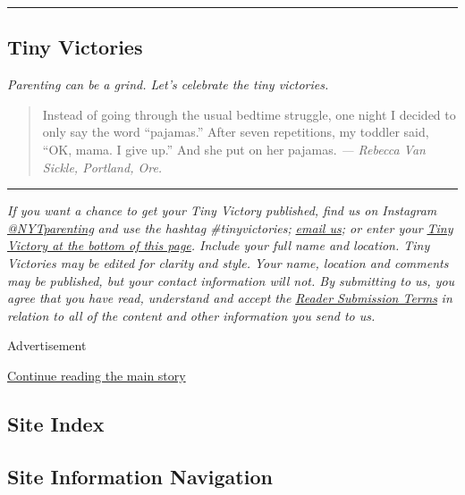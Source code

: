 \begin{center}\rule{0.5\linewidth}{\linethickness}\end{center}

\hypertarget{tiny-victories}{%
\subsection{Tiny Victories}\label{tiny-victories}}

\emph{Parenting can be a grind. Let's celebrate the tiny victories.}

\begin{quote}
Instead of going through the usual bedtime struggle, one night I decided
to only say the word ``pajamas.'' After seven repetitions, my toddler
said, ``OK, mama. I give up.'' And she put on her pajamas. \emph{---
Rebecca Van Sickle, Portland, Ore.}
\end{quote}

\begin{center}\rule{0.5\linewidth}{\linethickness}\end{center}

\emph{If you want a chance to get your Tiny Victory published, find us
on Instagram}
\href{https://www.instagram.com/nytparenting/}{\emph{@NYTparenting}}
\emph{and use the hashtag \#tinyvictories;}
\href{mailto:parenting_submissions@nytimes.com?subject=Tiny\%20Victories}{\emph{email
us}}\emph{; or enter your}
\href{https://www.nytimes.com/2019/03/19/reader-center/parenting-section-tiny-victories.html?module=inline}{\emph{Tiny
Victory at the bottom of this page}}\emph{. Include your full name and
location. Tiny Victories may be edited for clarity and style.}
\emph{Your name, location and comments may be published, but your
contact information will not. By submitting to us, you agree that you
have read, understand and accept the}
\href{https://nyti.ms/2Q9M7i0}{\emph{Reader Submission Terms}} \emph{in
relation to all of the content and other information you send to us.}

Advertisement

\protect\hyperlink{after-bottom}{Continue reading the main story}

\hypertarget{site-index}{%
\subsection{Site Index}\label{site-index}}

\hypertarget{site-information-navigation}{%
\subsection{Site Information
Navigation}\label{site-information-navigation}}

